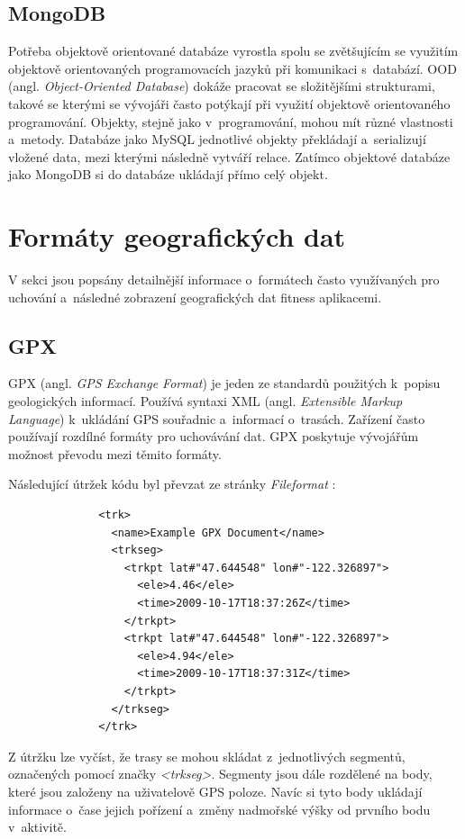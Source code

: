 \subsection{MongoDB}
Potřeba objektově orientované databáze vyrostla spolu se zvětšujícím se využitím objektově orientovaných programovacích jazyků při komunikaci s~databází. OOD (angl. \emph{Object-Oriented Database}) dokáže pracovat se složitějšími strukturami, takové se kterými se vývojáři často potýkají při využití objektově orientovaného programování. Objekty, stejně jako v~programování, mohou mít různé vlastnosti a~metody. Databáze jako MySQL jednotlivé objekty překládají a~serializují vložené data, mezi kterými následně vytváří relace. Zatímco objektové databáze jako MongoDB si do databáze ukládají přímo celý objekt.~\cite{mongodb} 
\newpage
\section{Formáty geografických dat}
V sekci jsou popsány detailnější informace o~formátech často využívaných pro uchování a~následné zobrazení geografických dat fitness aplikacemi.
\subsection{GPX}
\label{gpx}
GPX (angl. \emph{GPS Exchange Format}) je jeden ze standardů použitých k~popisu geologických informací. 
Používá syntaxi XML (angl. \emph{Extensible Markup Language}) k~ukládání GPS souřadnic a~informací o~trasách. 
Zařízení často používají rozdílné formáty pro uchovávání dat. GPX poskytuje vývojářům možnost převodu mezi těmito formáty. \cite{gpx}

Následující útržek kódu byl převzat ze stránky \emph{Fileformat} \cite{gpx_example}:
\begin{verbatim}
              <trk>
                <name>Example GPX Document</name>
                <trkseg>
                  <trkpt lat#"47.644548" lon#"-122.326897">
                    <ele>4.46</ele>
                    <time>2009-10-17T18:37:26Z</time>
                  </trkpt>
                  <trkpt lat#"47.644548" lon#"-122.326897">
                    <ele>4.94</ele>
                    <time>2009-10-17T18:37:31Z</time>
                  </trkpt>
                </trkseg>
              </trk>
\end{verbatim}
Z útržku lze vyčíst, že trasy se mohou skládat z~jednotlivých segmentů, označených pomocí značky \emph{<trkseg>}. Segmenty jsou dále rozdělené na body, které jsou založeny na uživatelově GPS poloze. Navíc si tyto body ukládají informace o~čase jejich pořízení a~změny nadmořské výšky od prvního bodu v~aktivitě.
